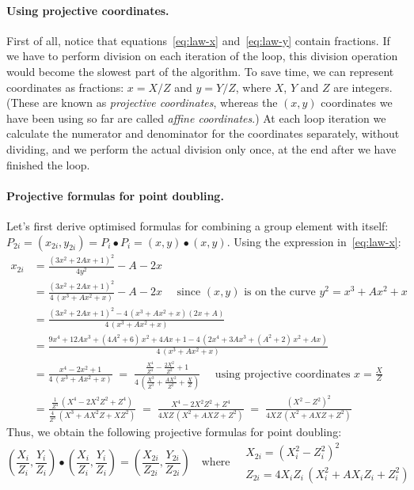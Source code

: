 \documentclass{article}
\begin{document}
\paragraph{Using projective coordinates.}

First of all, notice that equations~\eqref{eq:law-x} and~\eqref{eq:law-y} contain fractions.
If we have to perform division on each iteration of the loop, this division operation would become the slowest part of the algorithm.
To save time, we can represent coordinates as fractions: $x = X/Z$ and $y = Y/Z$, where $X$, $Y$ and $Z$ are integers.
(These are known as \emph{projective coordinates}, whereas the $(x, y)$ coordinates we have been using so far are called \emph{affine coordinates}.)
At each loop iteration we calculate the numerator and denominator for the coordinates separately, without dividing, and we perform the actual division only once, at the end after we have finished the loop.

\paragraph{Projective formulas for point doubling.}

Let's first derive optimised formulas for combining a group element with itself:
$P_{2i} = (x_{2i}, y_{2i}) = P_i \bullet P_i = (x, y) \bullet (x, y)$.
Using the expression in~\eqref{eq:law-x}:
\begin{align}
x_{2i} &= \frac{(3x^2 + 2Ax + 1)^2}{4y^2} - A - 2x \nonumber\\[5pt]
&= \frac{(3x^2 + 2Ax + 1)^2}{4\,(x^3 + Ax^2 + x)} - A - 2x 
    \quad\text{ since } (x, y) \text { is on the curve } y^2 = x^3 + Ax^2 + x \nonumber\\[5pt]
&= \frac{(3x^2 + 2Ax + 1)^2 - 4\,(x^3 + Ax^2 + x)(2x + A)}{4\,(x^3 + Ax^2 + x)} \nonumber\\[5pt]
&= \frac{9x^4 + 12Ax^3 + (4A^2 + 6)\,x^2 + 4Ax + 1 -4\,(2x^4 + 3Ax^3 + (A^2 + 2)\,x^2 + Ax)}{4\,(x^3 + Ax^2 + x)} \nonumber\\[5pt]
&= \frac{x^4 -2x^2 + 1}{4\,(x^3 + Ax^2 + x)} 
    \;=\; \frac{\frac{X^4}{Z^4} - \frac{2X^2}{Z^2} + 1}{4\,\left(\frac{X^3}{Z^3} + \frac{AX^2}{Z^2} + \frac{X}{Z}\right)}
    \quad\text{ using projective coordinates } x=\frac{X}{Z} \label{eq:alt-doubling}\\[5pt]
&= \frac{\frac{1}{Z^4}\,(X^4 - 2X^2 Z^2 + Z^4)}{\frac{4}{Z^3}\,(X^3 + AX^2 Z + X Z^2)}
    \;=\; \frac{X^4 - 2X^2 Z^2 + Z^4}{4XZ\,(X^2 + AX Z + Z^2)}
    \;=\; \frac{(X^2 - Z^2)^2}{4XZ\,(X^2 + AX Z + Z^2)} \nonumber
\end{align}
Thus, we obtain the following projective formulas for point doubling:
\begin{equation}
\left(\frac{X_i}{Z_i}, \frac{Y_i}{Z_i}\right) \bullet \left(\frac{X_i}{Z_i}, \frac{Y_i}{Z_i}\right) =
\left(\frac{X_{2i}}{Z_{2i}}, \frac{Y_{2i}}{Z_{2i}}\right) \quad\text{where}\quad
\begin{array}{l}
    X_{2i} = (X_i^2 - Z_i^2)^2 \\[5pt]
    Z_{2i} = 4X_i Z_i\,(X_i^2 + AX_i Z_i + Z_i^2)
\end{array}\label{eq:projective-double}
\end{equation}
\end{document}
